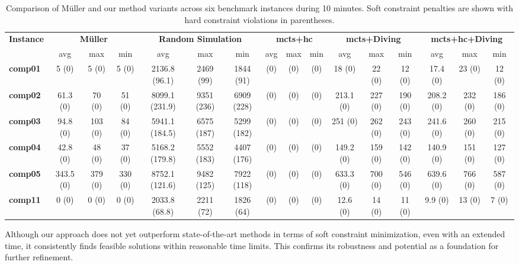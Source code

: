 \begin{sidewaystable}[p]
\centering
\setlength{\tabcolsep}{3pt}
\begin{tabular}{lccc|ccc|ccc|ccc|ccc}
\hline
\textbf{Instance}
& \multicolumn{3}{c|}{\textbf{Müller}} 
& \multicolumn{3}{c|}{\textbf{Random Simulation}} 
& \multicolumn{3}{c|}{\textbf{\ac{mcts}+\ac{hc}}} 
& \multicolumn{3}{c|}{\textbf{\ac{mcts}+Diving}} 
& \multicolumn{3}{c}{\textbf{\ac{mcts}+\ac{hc}+Diving}} \\
& avg & max & min 
& avg & max & min 
& avg & max & min 
& avg & max & min 
& avg & max & min \\
\hline
\textbf{comp01} & 5 (0) & 5 (0) & 5 (0) & 2136.8 (96.1) & 2469 (99) & 1844 (91) & (0) & (0) & (0) & 18 (0) & 22 (0) & 12 (0) & 17.4 (0) & 23 (0) & 12 (0) \\
\textbf{comp02} & 61.3 (0) & 70 (0) & 51 (0) & 8099.1 (231.9) & 9351 (236) & 6909 (228) & (0) & (0) & (0) & 213.1 (0) & 227 (0) & 190 (0) & 208.2 (0) & 232 (0) & 186 (0) \\
\textbf{comp03} & 94.8 (0) & 103 (0) & 84 (0) & 5941.1 (184.5) & 6575 (187) & 5299 (182) & (0) & (0) & (0) & 251 (0) & 262 (0) & 243 (0) & 241.6 (0) & 260 (0) & 215 (0) \\
\textbf{comp04} & 42.8 (0) & 48 (0) & 37 (0) & 5168.2 (179.8) & 5552 (183) & 4407 (176) & (0) & (0) & (0) & 149.2 (0) & 159 (0) & 142 (0) & 140.9 (0) & 151 (0) & 127 (0) \\
\textbf{comp05} & 343.5 (0) & 379 (0) & 330 (0) & 8752.1 (121.6) & 9482 (125) & 7922 (118) & (0) & (0) & (0) & 633.3 (0) & 700 (0) & 546 (0) & 639.6 (0) & 766 (0) & 587 (0) \\
\textbf{comp11} & 0 (0) & 0 (0) & 0 (0) & 2033.8 (68.8) & 2211 (72) & 1826 (64) & (0) & (0) & (0) & 12.6 (0) & 14 (0) & 11 (0) & 9.9 (0) & 13 (0) & 7 (0) \\
\hline
\end{tabular}
\caption{Comparison of Müller and our method variants across six benchmark instances during 10 minutes. Soft constraint penalties are shown with hard constraint violations in parentheses.}
\label{tab:comparison_results}
\end{sidewaystable}


Although our approach does not yet outperform state-of-the-art methods in terms of soft constraint minimization, even with an extended time, it consistently finds feasible solutions within reasonable time limits. This confirms its robustness and potential as a foundation for further refinement.

